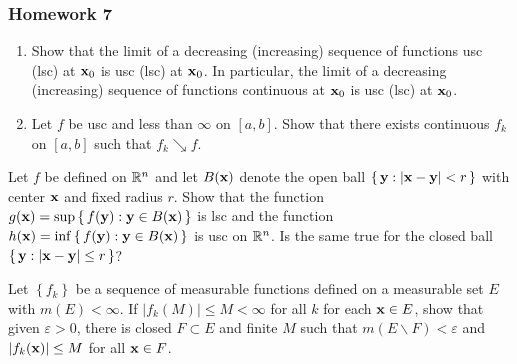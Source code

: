 \subsubsection{Homework 7}
\begin{problem}
  \hfill
  \begin{enumerate}[label=(\alph*),noitemsep]
  \item Show that the limit of a decreasing (increasing) sequence of
    functions usc (lsc) at $\mathbf{x}_0$ is usc (lsc) at $\mathbf{x}_0$. In
    particular, the limit of a decreasing (increasing) sequence of
    functions continuous at $\mathbf{x}_0$ is usc (lsc) at $\mathbf{x}_0$.
  \item Let $f$ be usc and less than $\infty$ on $[a,b]$. Show that there
    exists continuous $f_k$ on $[a,b]$ such that $f_k\searrow f$.
  \end{enumerate}
\end{problem}
\begin{solution}
\end{solution}

\begin{problem}
  Let $f$ be defined on $\mathbb{R}^n$ and let $B(\mathbf{x})$ denote the open ball
  $\left\{\,\mathbf{y}:|\mathbf{x}-\mathbf{y}|<r\,\right\}$ with center $\mathbf{x}$ and fixed
  radius $r$. Show that the function
  $g(\mathbf{x})=\sup\left\{\,f(\mathbf{y}):\mathbf{y}\in B(\mathbf{x})\,\right\}$ is lsc and the
  function $h(\mathbf{x})=\inf\left\{\,f(\mathbf{y}):\mathbf{y}\in B(\mathbf{x})\,\right\}$ is usc
  on $\mathbb{R}^n$. Is the same true for the closed ball
  $\left\{\,\mathbf{y}:|\mathbf{x}-\mathbf{y}|\leq r\,\right\}$?
\end{problem}
\begin{solution}
\end{solution}

\begin{problem}
  Let $\left\{f_k\right\}$ be a sequence of measurable functions defined on
  a measurable set $E$ with $m(E)<\infty$. If $|f_k(M)|\leq M<\infty$ for
  all $k$ for each $\mathbf{x}\in E$, show that given $\varepsilon>0$, there is
  closed $F\subset E$ and finite $M$ such that
  $m(E\smallsetminus F)<\varepsilon$ and $|f_k(\mathbf{x})|\leq M$ for all
  $\mathbf{x}\in F$.
\end{problem}
\begin{solution}
\end{solution}

